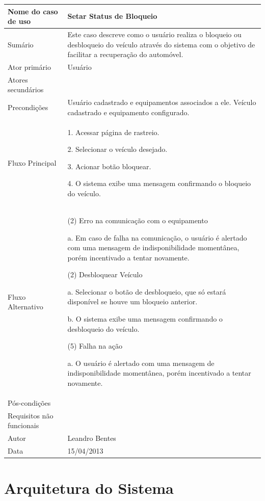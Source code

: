 \begin{flushleft}
\tablefirsthead{}
\tablehead{}
\tabletail{}
\tablelasttail{}
\begin{supertabular}{|m{5.5680003cm}|m{9.325cm}|}
\hline
Nome do caso de uso &
Setar Status de Bloqueio\\\hline
Sumário &
Este caso descreve como o usuário realiza o bloqueio ou desbloqueio do veículo através do sistema com o objetivo de facilitar a recuperação do automóvel. \\\hline
Ator primário &
Usuário\\\hline
Atores secundários &
~
\\\hline
Precondições &
Usuário cadastrado e equipamentos associados a ele. Veículo cadastrado e equipamento configurado.\\\hline
Fluxo Principal &
1. Acessar página de rastreio.

2. Selecionar o veículo desejado.

3. Acionar botão bloquear.

4. O sistema exibe uma mensagem confirmando o bloqueio do veículo.\\\hline
Fluxo Alternativo &
(2) Erro na comunicação com o equipamento

a. Em caso de falha na comunicação, o usuário é alertado com uma mensagem de indisponibilidade momentânea, porém incentivado a tentar novamente.

(2) Desbloquear Veículo

a. Selecionar o botão de desbloqueio, que só estará disponível se houve um bloqueio anterior.

b. O sistema exibe uma mensagem confirmando o desbloqueio do veículo.

(5) Falha na ação

a. O usuário é alertado com uma mensagem de indisponibilidade momentânea, porém incentivado a tentar novamente.\\\hline
Pós-condições &
~\\\hline
Requisitos não funcionais &
~\\\hline
Autor &
Leandro Bentes\\\hline
Data &
15/04/2013\\\hline
\end{supertabular}
\end{flushleft}

\section{Arquitetura do Sistema}

